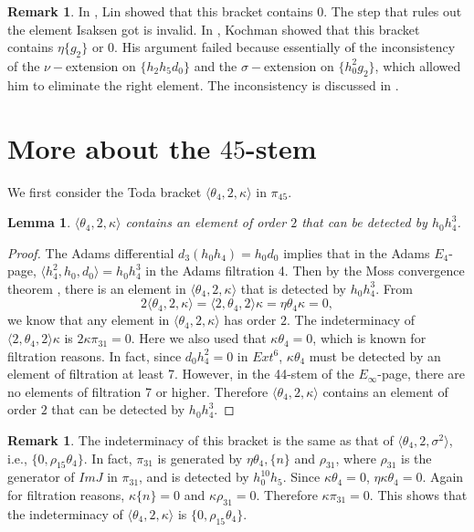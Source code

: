 \documentclass[psamsfonts]{amsart}
\newtheorem{lem}[thm]{Lemma}
\theoremstyle{definition}
\newtheorem{rem}[thm]{Remark}
\numberwithin{equation}{section}
\begin{document}
\begin{rem}
In \cite{Lin}, Lin showed that this bracket contains 0. The step that rules out the element Isaksen got is invalid. In \cite{Ko}, Kochman showed that this bracket contains $\eta\{g_2\}$ or 0. His argument failed because essentially of the inconsistency of the $\nu-$extension on $\{h_2h_5d_0\}$ and the $\sigma-$extension on $\{h_0^2g_2\}$, which allowed him to eliminate the right element. The inconsistency is discussed in \cite{DI1}.
\end{rem}

\section{More about the $45$-stem}

We first consider the Toda bracket $\langle \theta_4, 2, \kappa\rangle$ in $\pi_{45}$.

\begin{lem}
$\langle \theta_4, 2, \kappa\rangle$ contains an element of order $2$ that can be detected by $h_0h_4^3$.
\end{lem}

\begin{proof}
The Adams differential $d_3(h_0h_4)=h_0d_0$ implies that in the Adams $E_4$-page, $\langle h_4^2, h_0, d_0\rangle = h_0h_4^3$ in the Adams filtration 4. Then by the Moss convergence theorem \cite{Moss}, there is an element in $\langle \theta_4, 2, \kappa\rangle$ that is detected by $h_0h_4^3$. From
$$2\langle \theta_4, 2, \kappa\rangle= \langle 2, \theta_4, 2\rangle\kappa=\eta\theta_4\kappa=0,$$
we know that any element in $\langle \theta_4, 2, \kappa\rangle$ has order $2$. The indeterminacy of $\langle 2, \theta_4, 2\rangle\kappa$ is $2\kappa\pi_{31}=0$. Here we also used that $\kappa\theta_4=0$, which is known for filtration reasons. In fact, since $d_0h_4^2=0$ in $Ext^6$, $\kappa\theta_4$ must be detected by an element of filtration at least 7. However, in the 44-stem of the $E_{\infty}$-page, there are no elements of filtration 7 or higher. Therefore $\langle \theta_4, 2, \kappa\rangle$ contains an element of order $2$ that can be detected by $h_0h_4^3$.
\end{proof}

\begin{rem}
The indeterminacy of this bracket is the same as that of $\langle\theta_4, 2, \sigma^2\rangle$, i.e., $\{0, \rho_{15}\theta_4\}$. In fact, $\pi_{31}$ is generated by $\eta\theta_4, \{n\}$ and $\rho_{31}$, where $\rho_{31}$ is the generator of $ImJ$ in $\pi_{31}$, and is detected by $h_0^{10}h_5$. Since $\kappa\theta_4=0$, $\eta\kappa\theta_4=0$. Again for filtration reasons, $\kappa\{n\}=0$ and $\kappa\rho_{31}=0$. Therefore $\kappa\pi_{31}=0$. This shows that the indeterminacy of $\langle \theta_4, 2, \kappa\rangle$ is $\{0, \rho_{15}\theta_4\}$.
\end{rem}
\end{document}
